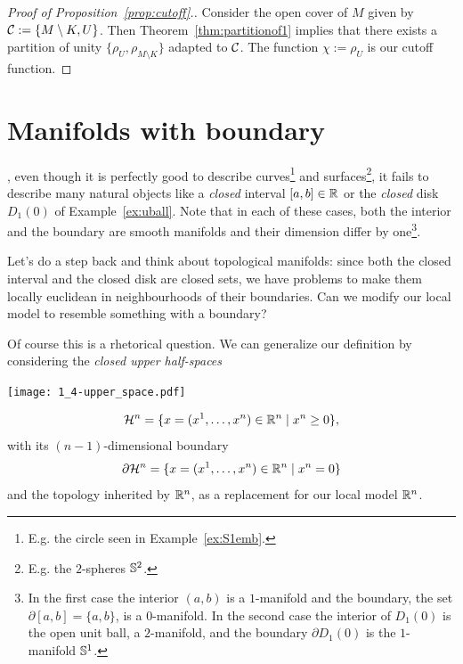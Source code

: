 \begin{proof}[Proof of Proposition~\ref{prop:cutoff}.]
  Consider the open cover of $M$ given by $\mathcal{C}:=\{M\setminus K, U\}$.
  Then Theorem~\ref{thm:partitionof1} implies that there exists a partition of unity $\{\rho_U, \rho_{M\setminus K}\}$ adapted to $\mathcal{C}$. The function $\chi := \rho_U$ is our cutoff function.
\end{proof}

\section{Manifolds with boundary}\label{sec:mbnd}

, even though it is perfectly good to describe curves\footnote{E.g. the circle seen in Example~\ref{ex:S1emb}.} and surfaces\footnote{E.g. the $2$-spheres $\mathbb{S}^2$.}, it fails to describe many natural objects like a \emph{closed} interval $[a,b]\in\mathbb{R}$ or the \emph{closed} disk $D_1(0)$ of Example~\ref{ex:uball}.
Note that in each of these cases, both the interior and the boundary are smooth manifolds and their dimension differ by one\footnote{In the first case the interior $(a,b)$ is a $1$-manifold and the boundary, the set $\partial[a,b] = \{a,b\}$, is a $0$-manifold. In the second case the interior of $D_1(0)$ is the open unit ball, a $2$-manifold, and the boundary $\partial D_1(0)$ is the $1$-manifold $\mathbb{S}^1$.}.

Let's do a step back and think about topological manifolds: since both the closed interval and the closed disk are closed sets, we have problems to make them locally euclidean in neighbourhoods of their boundaries.
Can we modify our local model to resemble something with a boundary?

Of course this is a rhetorical question.
We can generalize our definition by considering the \emph{closed upper half-spaces}
\begin{marginfigure}[2em]
  \texttt{[image: 1\_4-upper\_space.pdf]}
\end{marginfigure}
\begin{equation}
  \mathcal{H}^n = \{x=(x^1, \ldots, x^n)\in\mathbb{R}^n\mid x^n \geq 0\},
\end{equation}
with its $(n-1)$-dimensional boundary
\begin{equation}
  \partial\mathcal{H}^n = \{x=(x^1, \ldots, x^n)\in\mathbb{R}^n\mid x^n = 0\}
\end{equation}
and the topology inherited by $\mathbb{R}^n$, as a replacement for our local model $\mathbb{R}^n$.

